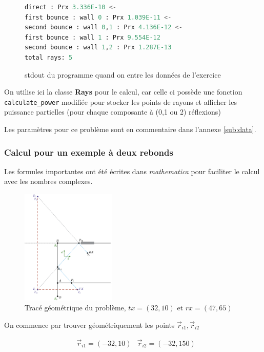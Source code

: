 \documentclass[sn-mathphys-num]{sn-jnl}%
\theoremstyle{thmstyleone}%
\theoremstyle{thmstyletwo}%
\theoremstyle{thmstylethree}%
\begin{document}
\begin{figure}[H]
\begin{lstlisting}[language=python]
direct : Prx 3.336E-10 <-
first bounce : wall 0 : Prx 1.039E-11 <-
second bounce : wall 0,1 : Prx 4.136E-12 <-
first bounce : wall 1 : Prx 9.554E-12
second bounce : wall 1,2 : Prx 1.287E-13
total rays: 5
\end{lstlisting}
\caption{stdout du programme quand on entre les données de l'exercice}
\end{figure}

On utilise ici la classe \textbf{Rays} pour le calcul, car celle ci
possède une fonction \texttt{calculate\_power} modifiée pour stocker les
points de rayons et afficher les puissance partielles (pour chaque composante à (0,1 ou 2) réflexions)

Les paramètres pour ce problème sont en commentaire dans l'annexe \ref{sub:data}.
\subsubsection{Calcul pour un exemple à deux rebonds}
\label{subsub:2rebond}

Les formules importantes ont été écrites dans \textit{mathematica} pour faciliter
le calcul avec les nombres complexes. 

\begin{figure}[H]
    \centering
    \includegraphics[width=0.4\textwidth]{images/verif/2_rebonds.png}
    \caption{Tracé géométrique du problème, $tx = (32, 10)$ et $rx = (47, 65)$}
    \label{f:exemple}
\end{figure}

On commence par trouver géométriquement les points $\vec{r}_{i1}, \vec{r}_{i2}$

\begin{align*}
    &\vec{r}_{i1} = (-32, 10) &\vec{r}_{i2} = (-32, 150)
\end{align*}
\end{document}
